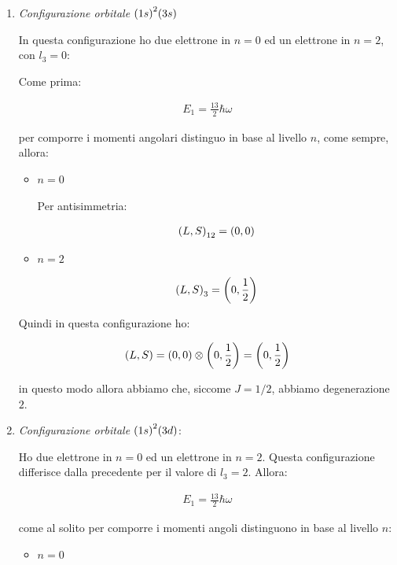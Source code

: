 \begin{itemize}
\begin{enumerate}
		\item \textit{Configurazione orbitale} $\qty(1s)^2\qty(3s)$
		
			In questa configurazione ho due elettrone in $n = 0$ ed un elettrone in $n = 2$, con $l_3 = 0$:
		
			Come prima:
			
		\begin{align*}
			E_1 = \frac{13}{2} \hbar \omega
		\end{align*}
		
			per comporre i momenti angolari distinguo in base al livello $n$, come sempre, allora:
			
		\begin{itemize}
			\item $n = 0$
				
				Per antisimmetria:
				
			\begin{align*}
				\qty(L, S)_{12} = \qty(0, 0)
			\end{align*}
			
			\item $n = 2$
			
			\begin{align*}
				\qty(L, S)_3 = \qty(0, \frac{1}{2})
			\end{align*}

		\end{itemize}

			Quindi in questa configurazione ho:
			
		\begin{align*}
			\qty(L, S) = \qty(0, 0) \otimes \qty(0, \frac{1}{2}) = \qty(0, \frac{1}{2})
		\end{align*}

			in questo modo allora abbiamo che, siccome $J = 1/2$, abbiamo degenerazione $2$.

		\item \textit{Configurazione orbitale} $\qty(1s)^2\qty(3d)$: 
		
			Ho due elettrone in $n = 0$ ed un elettrone in $n = 2$. Questa configurazione differisce dalla precedente per il valore di $l_3 = 2$. Allora:
			
		\begin{align*}
			E_1 = \frac{13}{2} \hbar \omega
		\end{align*}
		
			come al solito per comporre i momenti angoli distinguono in base al livello $n$:
		
		\begin{itemize}
			\item $n = 0$
			

\end{itemize}
\end{enumerate}
\end{itemize}
